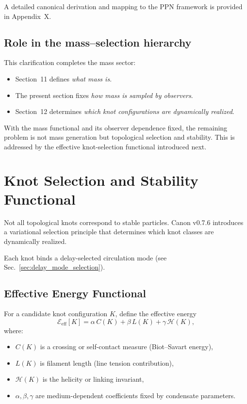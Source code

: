 \documentclass[10pt]{article}
\begin{document}
        A detailed canonical derivation and mapping to the PPN framework
        is provided in Appendix~X.

    \subsection{Role in the mass--selection hierarchy}

        This clarification completes the mass sector:
        \begin{itemize}
            \item Section~11 defines \emph{what mass is}.
            \item The present section fixes \emph{how mass is sampled by observers}.
            \item Section~12 determines \emph{which knot configurations are dynamically realized}.
        \end{itemize}

        With the mass functional and its observer dependence fixed,
        the remaining problem is not mass generation but topological
        selection and stability.
        This is addressed by the effective knot-selection functional
        introduced next.


    \section{Knot Selection and Stability Functional}
    \label{sec:knotSelection}

Not all topological knots correspond to stable particles.
Canon v0.7.6 introduces a variational selection principle that determines
which knot classes are dynamically realized.

Each knot binds a delay-selected circulation mode (see Sec.~\ref{sec:delay_mode_selection}).

\subsection{Effective Energy Functional}

For a candidate knot configuration $K$, define the effective energy
\begin{equation}
    \mathcal{E}_{\mathrm{eff}}[K]
    =
    \alpha\,C(K)
    + \beta\,L(K)
    + \gamma\,\mathcal{H}(K),
\end{equation}
where:
\begin{itemize}
    \item $C(K)$ is a crossing or self-contact measure (Biot--Savart energy),
    \item $L(K)$ is filament length (line tension contribution),
    \item $\mathcal{H}(K)$ is the helicity or linking invariant,
    \item $\alpha,\beta,\gamma$ are medium-dependent coefficients fixed by
    condensate parameters.
\end{itemize}
\end{document}
